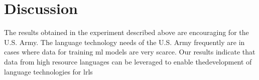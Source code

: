 
\section{Discussion}
\label{sec:disc}

The results obtained in the experiment described above are encouraging for the U.S. Army.
The language technology needs of the U.S. Army frequently are in cases where data for training \gls{ml} models are very scarce.
Our results indicate that data from high resource languages can be leveraged to enable thedevelopment of language technologies for \glspl{lrl}


